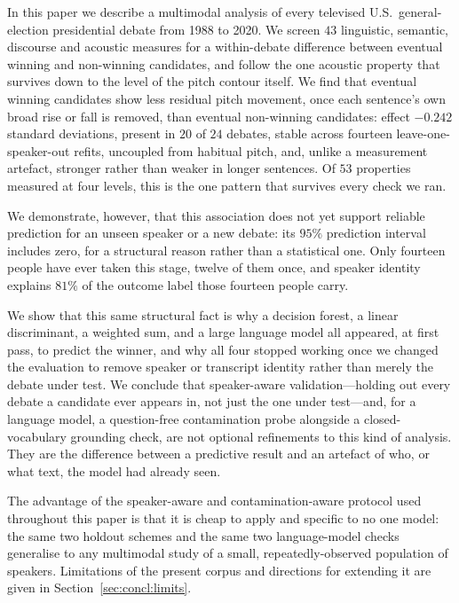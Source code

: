 \documentclass[journal]{IEEEtran}
\begin{document}
In this paper we describe a multimodal analysis of every televised U.S.\
general-election presidential debate from 1988 to 2020. We screen $43$
linguistic, semantic, discourse and acoustic measures for a within-debate
difference between eventual winning and non-winning candidates, and follow
the one acoustic property that survives down to the level of the pitch
contour itself. We find that eventual winning candidates show less residual
pitch movement, once each sentence's own broad rise or fall is removed, than
eventual non-winning candidates: effect $-0.242$ standard deviations,
present in $20$ of $24$ debates, stable across fourteen
leave-one-speaker-out refits, uncoupled from habitual pitch, and, unlike a
measurement artefact, stronger rather than weaker in longer sentences. Of
$53$ properties measured at four levels, this is the one pattern that
survives every check we ran.

We demonstrate, however, that this association does not yet support
reliable prediction for an unseen speaker or a new debate: its $95\%$
prediction interval includes zero, for a structural reason rather than a
statistical one. Only fourteen people have ever taken this stage, twelve of
them once, and speaker identity explains $81\%$ of the outcome label those
fourteen people carry.

We show that this same structural fact is why a decision forest, a linear
discriminant, a weighted sum, and a large language model all appeared, at
first pass, to predict the winner, and why all four stopped working once we
changed the evaluation to remove speaker or transcript identity rather than
merely the debate under test. We conclude that speaker-aware
validation---holding out every debate a candidate ever appears in, not just
the one under test---and, for a language model, a question-free
contamination probe alongside a closed-vocabulary grounding check, are not
optional refinements to this kind of analysis. They are the difference
between a predictive result and an artefact of who, or what text, the model
had already seen.

The advantage of the speaker-aware and contamination-aware protocol used
throughout this paper is that it is cheap to apply and specific to no one
model: the same two holdout schemes and the same two language-model checks
generalise to any multimodal study of a small, repeatedly-observed
population of speakers. Limitations of the present corpus and directions
for extending it are given in Section~\ref{sec:concl:limits}.
\end{document}
